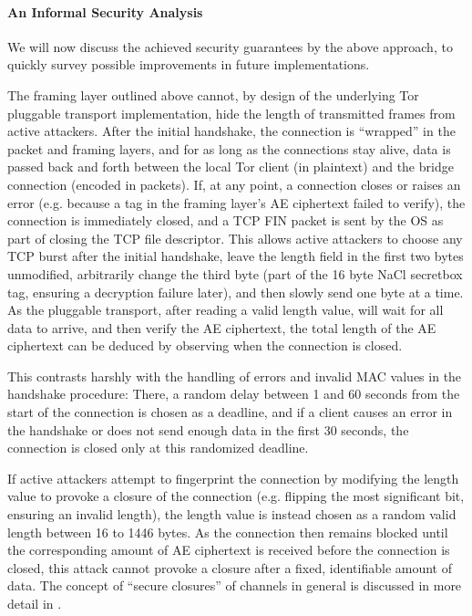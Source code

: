 \paragraph{An Informal Security Analysis}

We will now discuss the achieved security guarantees by the above approach, to quickly survey possible improvements in future implementations.

The framing layer outlined above cannot, by design of the underlying Tor pluggable transport implementation, hide the length of transmitted frames from active attackers.
After the initial handshake, the connection is ``wrapped'' in the packet and framing layers, and for as long as the connections stay alive, data is passed back and forth between the local Tor client (in plaintext) and the bridge connection (encoded in packets).
If, at any point, a connection closes or raises an error (e.g. because a tag in the framing layer's AE ciphertext failed to verify), the connection is immediately closed, and a TCP FIN packet is sent by the OS as part of closing the TCP file descriptor.
This allows active attackers to choose any TCP burst after the initial handshake, leave the length field in the first two bytes unmodified, arbitrarily change the third byte (part of the 16 byte NaCl secretbox tag, ensuring a decryption failure later), and then slowly send one byte at a time. As the pluggable transport, after reading a valid length value, will wait for all data to arrive, and then verify the AE ciphertext, the total length of the AE ciphertext can be deduced by observing when the connection is closed.

This contrasts harshly with the handling of errors and invalid MAC values in the handshake procedure: There, a random delay between 1 and 60 seconds from the start of the connection is chosen as a deadline, and if a client causes an error in the handshake or does not send enough data in the first 30 seconds, the connection is closed only at this randomized deadline.

If active attackers attempt to fingerprint the connection by modifying the length value to provoke a closure of the connection (e.g. flipping the most significant bit, ensuring an invalid length), the length value is instead chosen as a random valid length between 16 to 1446 bytes. As the connection then remains blocked until the corresponding amount of AE ciphertext is received before the connection is closed, this attack cannot provoke a closure after a fixed, identifiable amount of data. The concept of ``secure closures'' of channels in general is discussed in more detail in \cite{Fenske2024}.

